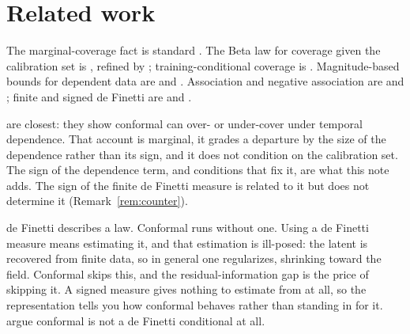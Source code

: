 \documentclass[11pt]{article}
\begin{document}
\section{Related work}

The marginal-coverage fact is standard \citep{vovk2005}. The Beta law for coverage given the
calibration set is \citet{vovk2012}, refined by \citet{marques2024}; training-conditional
coverage is \citet{bian2023}. Magnitude-based bounds for dependent data are
\citet{barber2023beyond} and \citet{oliveira2024}. Association and negative association are
\citet{esary1967} and \citet{joagdev1983}; finite and signed de Finetti are
\citet{diaconis1980} and \citet{kerns2006,leonetti2018}.

\citet{barberpananjady2026} are closest: they show conformal can over- or under-cover under
temporal dependence. That account is marginal, it grades a departure by the size of the
dependence rather than its sign, and it does not condition on the calibration set. The sign of
the dependence term, and conditions that fix it, are what this note adds. The sign of the finite
de Finetti measure is related to it but does not determine it (Remark~\ref{rem:counter}).

de Finetti describes a law. Conformal runs without one. Using a de Finetti measure means
estimating it, and that estimation is ill-posed: the latent is recovered from finite data, so in
general one regularizes, shrinking toward the field. Conformal skips this, and the
residual-information gap is the price of skipping it. A signed measure gives nothing to estimate
from at all, so the representation tells you how conformal behaves rather than standing in for
it. \citet{datta2025} argue conformal is not a de Finetti conditional at all.



\end{document}
